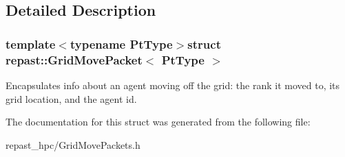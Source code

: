 \subsection{Detailed Description}
\subsubsection*{template$<$typename Pt\-Type$>$struct repast\-::\-Grid\-Move\-Packet$<$ Pt\-Type $>$}

Encapsulates info about an agent moving off the grid\-: the rank it moved to, its grid location, and the agent id. 

The documentation for this struct was generated from the following file\-:\begin{DoxyCompactItemize}
\item 
repast\-\_\-hpc/Grid\-Move\-Packets.\-h\end{DoxyCompactItemize}
